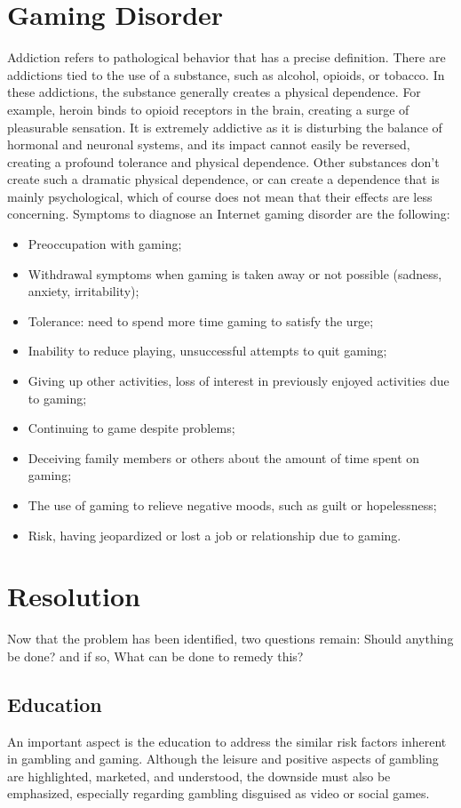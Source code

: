 \documentclass{article}
\begin{document}
\section{Gaming Disorder}
Addiction refers to pathological behavior that has a precise definition. There are addictions tied to the use of a substance, such as alcohol, opioids, or tobacco. In these addictions, the substance generally creates a physical dependence. For example, heroin binds to opioid receptors in the brain, creating a surge of pleasurable sensation. It is extremely addictive as it is disturbing the balance of hormonal and neuronal systems, and its impact cannot easily be reversed, creating a profound tolerance and physical dependence. Other substances don’t create such a dramatic physical dependence, or can create a dependence that is mainly psychological, which of course does not mean that their effects are less concerning.\cite{freeman2008internet}
Symptoms to diagnose an Internet gaming disorder are the following:
\begin{itemize}
    \item Preoccupation with gaming;
    \item Withdrawal symptoms when gaming is taken away or not possible (sadness, anxiety, irritability);
    \item Tolerance: need to spend more time gaming to satisfy the urge;
    \item Inability to reduce playing, unsuccessful attempts to quit gaming;
    \item Giving up other activities, loss of interest in previously enjoyed activities due to gaming;
    \item Continuing to game despite problems;
    \item Deceiving family members or others about the amount of time spent on gaming;
    \item The use of gaming to relieve negative moods, such as guilt or hopelessness;
    \item Risk, having jeopardized or lost a job or relationship due to gaming.
\end{itemize}

\section{Resolution}
Now that the problem has been identified, two questions remain: Should anything be done? and if so, What can be done to remedy this?
\subsection{Education}
An important aspect is the education to address the similar risk factors inherent in
gambling and gaming. Although the leisure and positive aspects of gambling are highlighted, marketed, and understood, the downside must also be emphasized, especially regarding gambling disguised as video or
social games.\cite{spekman2013gaming}
\end{document}
